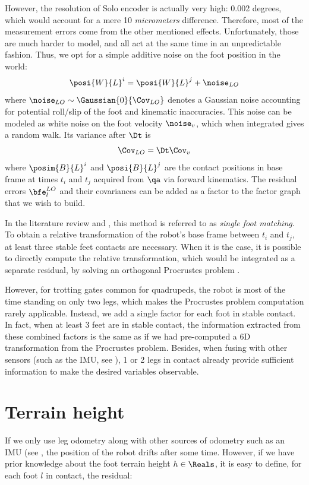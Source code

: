 However, the resolution of Solo encoder is actually very high: 0.002 degrees, which would account for a mere 10 \textit{micrometers} difference.
Therefore, most of the measurement errors come from the other mentioned effects. Unfortunately, those are much harder to model, and all act at the same time
in an unpredictable fashion. Thus, we opt for a simple additive noise on the foot position in the world:
%
\begin{equation}
    \posi{W}{L}^i = \posi{W}{L}^j + \noise_{LO}
\end{equation}
%
where $\noise_{LO} \sim \Gaussian{0}{\Cov_{LO}}$ denotes a Gaussian noise accounting for potential roll/slip of the foot and kinematic inaccuracies.
This noise can be modeled as white noise on the foot velocity $\noise_v$, which when integrated gives a random walk.  
Its variance after $\Dt$ is 
%
\begin{equation}
    \Cov_{LO} = \Dt \Cov_v
\end{equation}
%
where $\posim{B}{L}^i$ and $\posi{B}{L}^j$ are the contact positions in base frame at times $t_i$ and $t_j$ acquired from $\qa$ via forward kinematics. 
The residual errors $\bfe^{LO}_l$ and their covariances can be added as a factor to the factor graph that we wish to build.

In the literature review and , this method is referred to as \textit{single foot matching}. To obtain
a relative transformation of the robot's base frame between $t_i$ and $t_j$, at least three stable feet contacts are necessary. When it is the case, it is possible to directly compute the
relative transformation, which would be integrated as a separate residual, by solving an orthogonal Procrustes problem \cite{roston1991dead}.

However, for trotting gates common for quadrupeds, the robot is most of the time standing on only two legs, which makes the Procrustes problem computation rarely applicable. Instead, we add a single factor for each foot in stable contact. In fact, when at least 3 feet are in stable contact, the information extracted from these combined factors is the same as if we had pre-computed a 6D transformation from the Procrustes problem. Besides, when fusing with other sensors (such as the IMU,
see ), 1 or 2 legs in contact already provide sufficient information to make the desired variables observable.



\section{Terrain height}
If we only use leg odometry along with other sources of odometry such as an IMU (see , the position of the robot drifts after some time. However, if we have prior knowledge about the foot terrain height $h \in \Reals$, it is easy to define, for each foot $l$ in contact, the residual:

